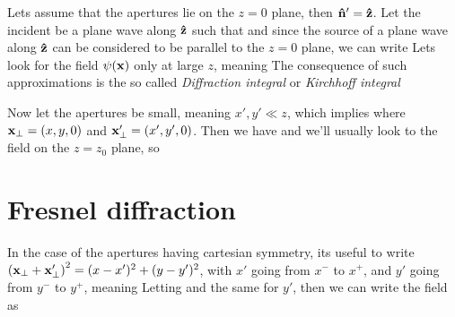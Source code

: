 \documentclass[oneside, 12pt, notitlepage]{book}
\begin{document}
Lets assume that the apertures lie on the \(z=0\) plane, then \(\vu{n}'=\vu{z}\). Let the incident be a plane wave along \(\vu{z}\) such that
and since the source of a plane wave along \(\vu{z}\) can be considered to be parallel to the \(z=0\) plane, we can write
Lets look for the field \(\psi(\vb{x})\) only at large \(z\), meaning
The consequence of such approximations is the so called \emph{Diffraction integral} or \emph{Kirchhoff integral}
\begin{tcolorbox}
\end{tcolorbox}
Now let the apertures be small, meaning \(x',y' \ll z\), which implies
where \(\vb{x}_{\perp} = (x,y,0)\) and \(\vb{x}_{\perp}' = (x',y',0)\). Then we have
and we'll usually look to the field on the \(z=z_0\) plane, so
\par

\section{Fresnel diffraction}

In the case of the apertures having cartesian symmetry, its useful to write \(\left(\vb{x}_{\perp} + \vb{x_{\perp}'}\right)^2 = (x-x')^2 + (y-y')^2\), with \(x'\) going from \(x^{-}\) to \(x^{+}\), and \(y'\) going from \(y^{-}\) to \(y^{+}\), meaning
Letting
and the same for \(y'\), then we can write the field as
\end{document}
